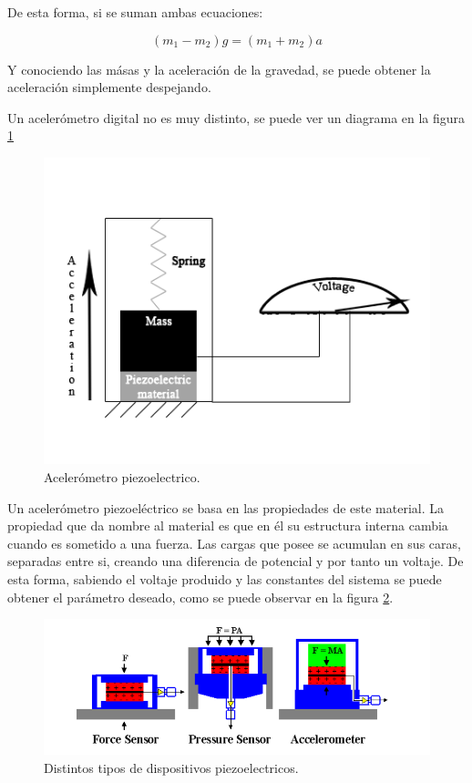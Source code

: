 \documentclass[12pt]{article}
\numberwithin{equation}{section}
\begin{document}
De esta forma, si se suman ambas ecuaciones:

\begin{equation}
(m_1 -m_2)g = (m_1+m_2)a
\end{equation}

Y conociendo las másas y la aceleración de la gravedad, se puede obtener la aceleración simplemente despejando.

Un acelerómetro digital no es muy distinto, se puede ver un diagrama en la figura \ref{fig:piezoelectric}

\begin{figure}[h]
    \centering
    \includegraphics[scale=0.8]{piezoelectric.png}
    \caption{Acelerómetro piezoelectrico.}
    \label{fig:piezoelectric}
\end{figure}

Un acelerómetro piezoeléctrico se basa en las propiedades de este material. La propiedad que da nombre al material es que en él su estructura interna cambia cuando es sometido a una fuerza. Las cargas que posee se acumulan en sus caras, separadas entre si, creando una diferencia de potencial y por tanto un voltaje. De esta forma, sabiendo el voltaje produido y las constantes del sistema se puede obtener el parámetro deseado, como se puede observar en la figura \ref{fig:piezotypes}.

\begin{figure}[h]
    \centering
    \includegraphics[width=1\textwidth]{piezoelectrictypes.png}
    \caption{Distintos tipos de dispositivos piezoelectricos.}
    \label{fig:piezotypes}
\end{figure}
\end{document}

